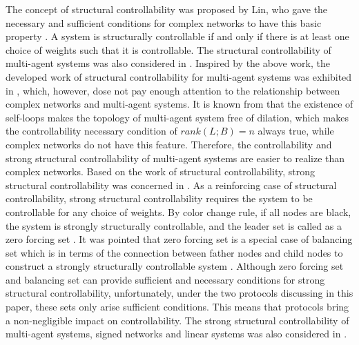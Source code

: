 \documentclass[a4paper,11pt]{article}
\begin{document}
The concept of structural controllability was proposed by Lin, who gave the necessary and sufficient conditions for complex networks to have this basic property \cite{lin}. A system is structurally controllable if and only if there is at least one choice of weights such that it is controllable. The structural controllability of multi-agent systems was also considered in \cite{sc}. Inspired by the above work, the developed work of structural controllability for multi-agent systems was  exhibited in \cite{sc1}, which, however, dose not pay enough attention to the relationship between complex networks and multi-agent systems. It is known from \cite{lin,sc,sc1,scguan} that the existence of self-loops makes the topology of multi-agent system free of dilation, which makes the controllability necessary condition of $rank(L;B)=n$ always true, while complex networks do not have this feature. Therefore, the controllability and strong structural controllability of multi-agent systems are easier to realize than complex networks. Based on the work of structural controllability, strong structural controllability was concerned in \cite{ssc,zeroforce1,zeroforce2}.  As a reinforcing case of structural controllability, strong structural controllability requires the system to be controllable for any choice of weights. By color change rule, if all nodes are black, the system is strongly structurally controllable, and the leader set is called as a zero forcing set \cite{zeroforce1}. It was pointed that zero forcing set is a special case of balancing set which is in terms of the connection between father nodes and child nodes to construct a strongly structurally controllable system \cite{zeroforce2}. Although zero forcing set and balancing set can provide sufficient and necessary conditions for strong structural controllability, unfortunately, under the two protocols discussing in this paper, these sets only arise sufficient conditions. This means that protocols bring a non-negligible impact on controllability. The strong structural controllability of multi-agent systems, signed networks and linear systems was also considered in \cite{com1,com2,com3,com4,com5,com6}.
\end{document}
